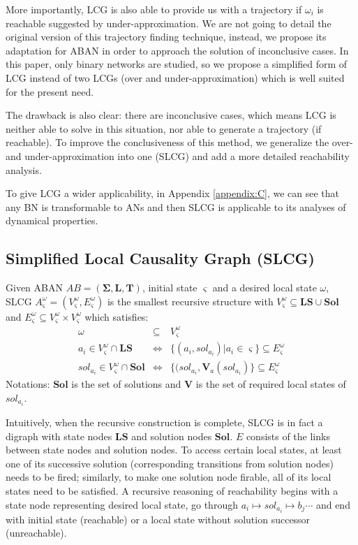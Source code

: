 \documentclass[runningheads]{llncs}
\newcommand{\omesi}{^\omega_\varsigma}
\begin{document}
More importantly, LCG is also able to provide us with a trajectory if $\omega_i$ is reachable suggested by under-approximation.
We are not going to detail the original version of this trajectory finding technique, instead, we propose its adaptation for ABAN in order to approach the solution of inconclusive cases.
In this paper, only binary networks are studied, so we propose a simplified form of LCG instead of two LCGs (over and under-approximation) which is well suited for the present need.

The drawback is also clear: there are inconclusive cases, which means LCG is neither able to solve in this situation, nor able to generate a trajectory (if reachable).
To improve the conclusiveness of this method, we generalize the over- and under-approximation into one (SLCG) and add a more detailed reachability analysis.

To give LCG a wider applicability, in Appendix \ref{appendix:C}, we can see that any BN is transformable to ANs and then SLCG is applicable to its analyses of dynamical properties.
\subsection{Simplified Local Causality Graph (SLCG)}

\begin{definition}[SLCG]\label{defLCG}
Given ABAN $AB = (\mathbf{\Sigma},\mathbf{L},\mathbf{T})$, initial state $\varsigma$ and a desired local state $\omega$, SLCG $A\omesi= (V\omesi,E\omesi)$ is the smallest recursive structure with $V\omesi \subseteq \mathbf{LS}\cup \mathbf{Sol}$ and $E\omesi \subseteq V\omesi\times V\omesi$ which satisfies:
\begin{eqnarray*}
\omega&\subseteq& V\omesi \\
a_i\in V\omesi\cap \mathbf{LS} &\Leftrightarrow& \{ (a_i, sol_{a_i})| a_i\in \varsigma\}\subseteq E\omesi \\
sol_{a_i}\in V\omesi \cap \mathbf{Sol}&\Leftrightarrow& \{ (sol_{a_i},\mathbf{V}_a (sol_{a_i})\}\subseteq E\omesi
\end{eqnarray*}
Notations: $\mathbf{Sol}$ is the set of solutions and $\mathbf{V}$ is the set of required local states of $sol_{a_i}$.
\end{definition}
Intuitively, when the recursive construction is complete, SLCG is in fact a digraph with state nodes $\mathbf{LS}$ and solution nodes $\mathbf{Sol}$. 
$E$ consists of the links between state nodes and solution nodes. 
To access certain local states, at least one of its successive solution (corresponding transitions from solution nodes) needs to be fired; similarly, to make one solution node firable, all of its local states need to be satisfied. 
A recursive reasoning of reachability begins with a state node representing desired local state, go through $a_i\mapsto sol_{a_i}\mapsto b_j \cdots$ and end with initial state (reachable) or a local state without solution successor (unreachable).
\end{document}
